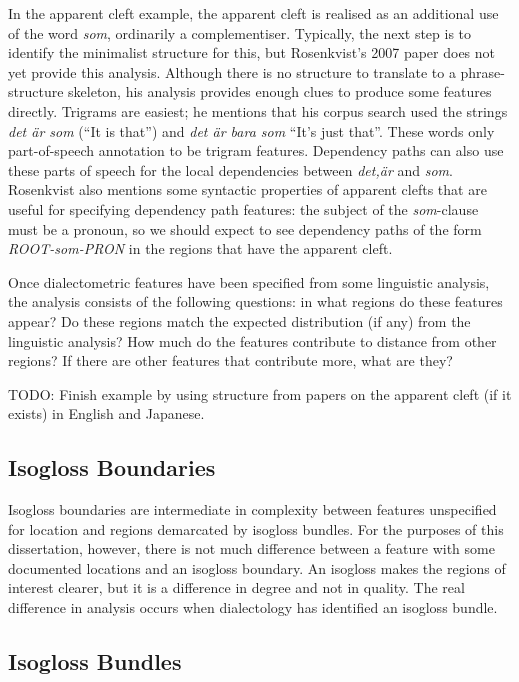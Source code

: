 In the apparent cleft example, the apparent cleft is realised as an
additional use of the word {\it som}, ordinarily a
complementiser. Typically, the next step is to identify the minimalist
structure for this, but Rosenkvist's 2007 paper does not yet provide
this analysis. Although there is no structure to translate to a
phrase-structure skeleton, his analysis provides enough clues to
produce some features directly. Trigrams are easiest; he mentions that
his corpus search used the strings {\it det \"ar som} (``It is that'')
and {\it det \"ar bara som} ``It's just that''. These words only
part-of-speech annotation to be trigram features. Dependency
paths can also use these parts of speech for the local dependencies
between {\it det,\"ar} and {\it som}. Rosenkvist also mentions
some syntactic properties of apparent clefts that are useful for
specifying dependency path features: the subject of the {\it
  som}-clause must be a pronoun, so we should expect to see
dependency paths of the form {\it ROOT-som-PRON} in the regions that
have the apparent cleft.

Once dialectometric features have been specified from some linguistic
analysis, the analysis consists of the following questions: in what
regions do these features appear? Do these regions match the expected
distribution (if any) from the linguistic analysis? How much do
the features contribute to distance from other regions? If there are
other features that contribute more, what are they?

TODO: Finish example by using structure from papers on the apparent
cleft (if it exists) in English and Japanese.

\subsection{Isogloss Boundaries}

Isogloss boundaries are intermediate in complexity between features unspecified
for location and regions demarcated by isogloss bundles. For the
purposes of this dissertation, however, there is not much difference
between a feature with some documented locations and an isogloss
boundary. An isogloss makes the regions of interest clearer, but it is
a difference in degree and not in quality. The real difference in
analysis occurs when dialectology has identified an isogloss bundle.

\subsection{Isogloss Bundles}

